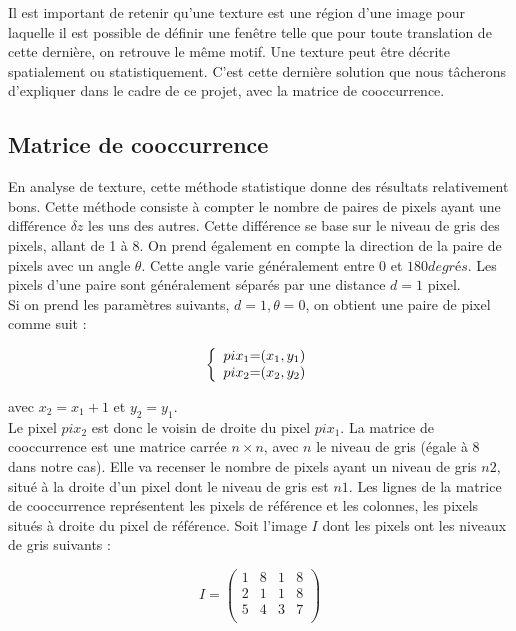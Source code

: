 Il est important de retenir qu'une texture est une région d'une image pour laquelle il est possible de définir une fenêtre telle que pour toute translation de cette dernière, on retrouve le même motif. Une texture peut être décrite spatialement ou statistiquement. C'est cette dernière solution que nous tâcherons d'expliquer dans le cadre de ce projet, avec la matrice de cooccurrence.

\subsection{Matrice de cooccurrence}

En analyse de texture, cette méthode statistique donne des résultats relativement bons. Cette méthode consiste à compter le nombre de paires de pixels ayant une différence $\delta z$ les uns des autres. Cette différence se base sur le niveau de gris des pixels, allant de 1 à 8. On prend également en compte la direction de la paire de pixels avec un angle $\theta$. Cette angle varie généralement entre $0$ et $180 degrés$. Les pixels d'une paire sont généralement séparés par une distance $d=1$ pixel.\\

Si on prend les paramètres suivants, $d=1, \theta = 0$, on obtient une paire de pixel comme suit :

\[
 \left \{
 \begin{array}{c @{=} c}
     pix_1 & (x_1, y_1) \\
     pix_2 & (x_2, y_2) \\
 \end{array}
 \right.
\]

avec $x_2 = x_1 + 1$ et $y_2 = y_1$.\\

Le pixel $pix_2$ est donc le voisin de droite du pixel $pix_1$. La matrice de cooccurrence est une matrice carrée $n\times n$, avec $n$ le niveau de gris (égale à 8 dans notre cas). Elle va recenser le nombre de pixels ayant un niveau de gris $n2$, situé à la droite d'un pixel dont le niveau de gris est $n1$. Les lignes de la matrice de cooccurrence représentent les pixels de référence et les colonnes, les pixels situés à droite du pixel de référence. Soit l'image $I$ dont les pixels ont les niveaux de gris suivants :

\[
 I = \begin{pmatrix}
     1 & 8 & 1 & 8 \\
     2 & 1 & 1 & 8 \\
     5 & 4 & 3 & 7 \\     
 \end{pmatrix}
\]

